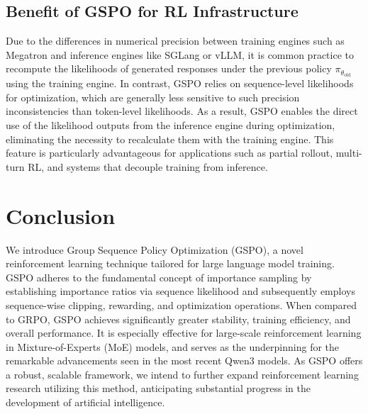 \subsection{Benefit of GSPO for RL Infrastructure}

Due to the differences in numerical precision between training engines such as Megatron and inference engines like SGLang or vLLM, it is common practice to recompute the likelihoods of generated responses under the previous policy $\pi_{\theta_\text{old}}$ using the training engine. In contrast, GSPO relies on sequence-level likelihoods for optimization, which are generally less sensitive to such precision inconsistencies than token-level likelihoods. As a result, GSPO enables the direct use of the likelihood outputs from the inference engine during optimization, eliminating the necessity to recalculate them with the training engine. This feature is particularly advantageous for applications such as partial rollout, multi-turn RL, and systems that decouple training from inference.

\section{Conclusion}

We introduce Group Sequence Policy Optimization (GSPO), a novel reinforcement learning technique tailored for large language model training. GSPO adheres to the fundamental concept of importance sampling by establishing importance ratios via sequence likelihood and subsequently employs sequence-wise clipping, rewarding, and optimization operations. When compared to GRPO, GSPO achieves significantly greater stability, training efficiency, and overall performance. It is especially effective for large-scale reinforcement learning in Mixture-of-Experts (MoE) models, and serves as the underpinning for the remarkable advancements seen in the most recent Qwen3 models. As GSPO offers a robust, scalable framework, we intend to further expand reinforcement learning research utilizing this method, anticipating substantial progress in the development of artificial intelligence.

